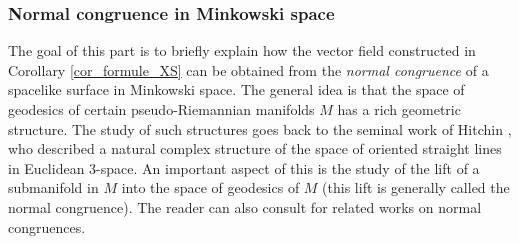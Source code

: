 \documentclass[10pt]{amsart}
\theoremstyle{plain}
\theoremstyle{definition}
\begin{document}
\subsubsection{Normal congruence in Minkowski space}
The goal of this part is to briefly explain how the vector field constructed in Corollary \ref{cor_formule_XS} can be obtained from the \emph{normal congruence} of a spacelike surface in Minkowski space. The general idea is that the space of geodesics of certain pseudo-Riemannian manifolds $M$ has a rich geometric structure. The study of such structures goes back to the seminal work of Hitchin \cite{Monopole_Hitchin}, who described a natural complex structure of the space of oriented straight lines in Euclidean $3$-space. An important aspect of this is the study of the lift of a submanifold in $M$ into the space of geodesics of $M$ (this lift is generally called the normal congruence). The reader can also consult \cite{ML_in_tangent_bundle, Anciaux_space_of_geodesic, Emam_Seppi1} for related works on normal congruences.
\end{document}
